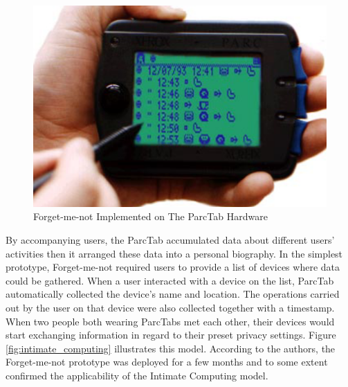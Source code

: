 \begin{figure}[!h]
\begin{centering}
\includegraphics[scale=0.7]{pics/forget_me_not}
\caption{Forget-me-not Implemented on The ParcTab Hardware}\label{fig:forget_me_not}
\end{centering}
\end{figure}

By accompanying users, the ParcTab accumulated data about different users' activities then it arranged these data into a personal biography. In the simplest prototype, Forget-me-not required users to provide a list of devices where data could be gathered. When a user interacted with a device on the list, ParcTab automatically collected the device's name and location. The operations carried out by the user on that device were also collected together with a timestamp. When two people both wearing ParcTabs met each other, their devices would start exchanging information in regard to their preset privacy settings. Figure \ref{fig:intimate_computing} illustrates this model. According to the authors, the Forget-me-not prototype was deployed for a few months and to some extent confirmed the applicability of the Intimate Computing model. 

